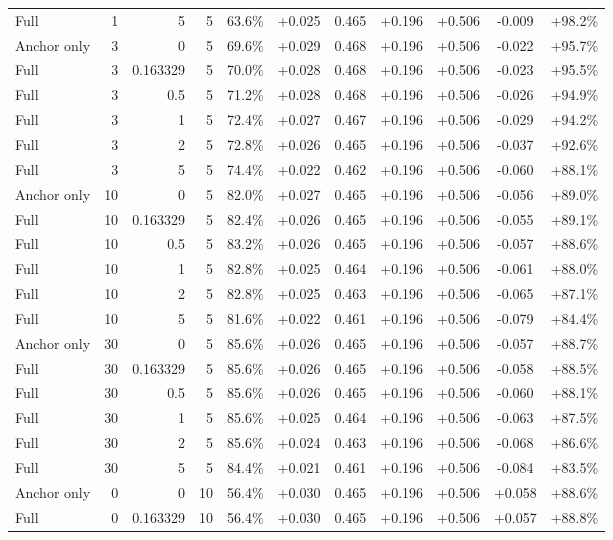 \begin{table}[htbp]
\begin{tabular}{lrrrccccccc}
Full & 1 & 5 & 5 & 63.6\% & +0.025 & 0.465 & +0.196 & +0.506 & -0.009 & +98.2\% \\
Anchor only & 3 & 0 & 5 & 69.6\% & +0.029 & 0.468 & +0.196 & +0.506 & -0.022 & +95.7\% \\
Full & 3 & 0.163329 & 5 & 70.0\% & +0.028 & 0.468 & +0.196 & +0.506 & -0.023 & +95.5\% \\
Full & 3 & 0.5 & 5 & 71.2\% & +0.028 & 0.468 & +0.196 & +0.506 & -0.026 & +94.9\% \\
Full & 3 & 1 & 5 & 72.4\% & +0.027 & 0.467 & +0.196 & +0.506 & -0.029 & +94.2\% \\
Full & 3 & 2 & 5 & 72.8\% & +0.026 & 0.465 & +0.196 & +0.506 & -0.037 & +92.6\% \\
Full & 3 & 5 & 5 & 74.4\% & +0.022 & 0.462 & +0.196 & +0.506 & -0.060 & +88.1\% \\
Anchor only & 10 & 0 & 5 & 82.0\% & +0.027 & 0.465 & +0.196 & +0.506 & -0.056 & +89.0\% \\
Full & 10 & 0.163329 & 5 & 82.4\% & +0.026 & 0.465 & +0.196 & +0.506 & -0.055 & +89.1\% \\
Full & 10 & 0.5 & 5 & 83.2\% & +0.026 & 0.465 & +0.196 & +0.506 & -0.057 & +88.6\% \\
Full & 10 & 1 & 5 & 82.8\% & +0.025 & 0.464 & +0.196 & +0.506 & -0.061 & +88.0\% \\
Full & 10 & 2 & 5 & 82.8\% & +0.025 & 0.463 & +0.196 & +0.506 & -0.065 & +87.1\% \\
Full & 10 & 5 & 5 & 81.6\% & +0.022 & 0.461 & +0.196 & +0.506 & -0.079 & +84.4\% \\
Anchor only & 30 & 0 & 5 & 85.6\% & +0.026 & 0.465 & +0.196 & +0.506 & -0.057 & +88.7\% \\
Full & 30 & 0.163329 & 5 & 85.6\% & +0.026 & 0.465 & +0.196 & +0.506 & -0.058 & +88.5\% \\
Full & 30 & 0.5 & 5 & 85.6\% & +0.026 & 0.465 & +0.196 & +0.506 & -0.060 & +88.1\% \\
Full & 30 & 1 & 5 & 85.6\% & +0.025 & 0.464 & +0.196 & +0.506 & -0.063 & +87.5\% \\
Full & 30 & 2 & 5 & 85.6\% & +0.024 & 0.463 & +0.196 & +0.506 & -0.068 & +86.6\% \\
Full & 30 & 5 & 5 & 84.4\% & +0.021 & 0.461 & +0.196 & +0.506 & -0.084 & +83.5\% \\
Anchor only & 0 & 0 & 10 & 56.4\% & +0.030 & 0.465 & +0.196 & +0.506 & +0.058 & +88.6\% \\
Full & 0 & 0.163329 & 10 & 56.4\% & +0.030 & 0.465 & +0.196 & +0.506 & +0.057 & +88.8\% \\

\end{tabular}
\end{table}
